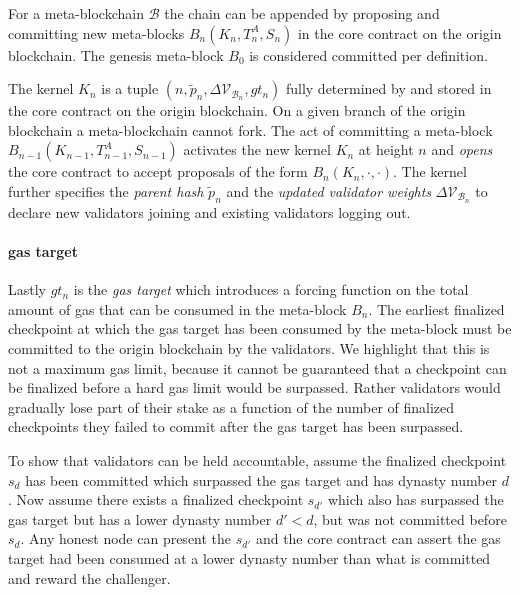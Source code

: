 \documentclass[12pt,a4paper]{article}
\begin{document}
For a meta-blockchain $\mathcal{B}$ the chain can be appended by proposing and committing new meta-blocks $B_n(K_n, T^A_n, S_n)$ in the core contract on the origin block\-chain.
The genesis meta-block $B_0$ is considered committed per definition.

The kernel $K_n$ is a tuple $(n, \tilde{p}_n, \Delta\mathcal{V}_{\mathcal{B}_n}, gt_n)$ fully determined by and stored in the core contract on the origin blockchain. %
On a given branch of the origin blockchain a meta-blockchain cannot fork.
The act of committing a meta-block $B_{n-1}(K_{n-1}, T^A_{n-1}, S_{n-1})$ activates the new kernel $K_n$ at height $n$ and \emph{opens} the core contract to accept proposals of the form $B_n(K_n, \cdot, \cdot)$.
The kernel further specifies the \emph{parent hash} $\tilde{p}_n$ and the \emph{updated validator weights} $\Delta\mathcal{V}_{\mathcal{B}_n}$ to declare new validators joining and existing validators logging out.

\paragraph{gas target} Lastly $gt_n$ is the \emph{gas target} which introduces a forcing function on the total amount of gas that can be consumed in the meta-block $B_n$.
The earliest finalized checkpoint at which the gas target has been consumed by the meta-block must be committed to the origin blockchain by the validators.
We highlight that this is not a maximum gas limit, because it cannot be guaranteed that a checkpoint can be finalized before a hard gas limit would be surpassed. Rather validators would gradually lose part of their stake as a function of the number of finalized checkpoints they failed to commit after the gas target has been surpassed.

To show that validators can be held accountable, assume the finalized checkpoint $s_d$ has been committed which surpassed the gas target and has dynasty number $d$.
Now assume there exists a finalized checkpoint $s_{d'}$ which also has surpassed the gas target but has a lower dynasty number $d' < d$, but was not committed before $s_d$.
Any honest node can present the $s_{d'}$ and the core contract can assert the gas target had been consumed at a lower dynasty number than what is committed and reward the challenger.
\end{document}
